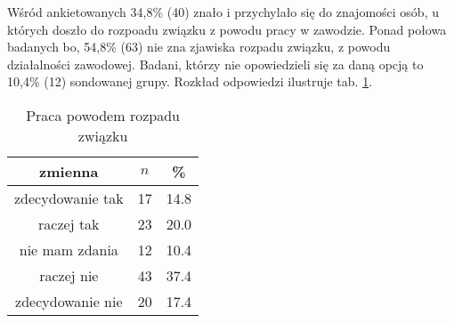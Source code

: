 

Wśród ankietowanych 34,8\% (40) znało i przychylało się do znajomości osób, u których doszło do rozpoadu związku z powodu pracy w zawodzie. Ponad połowa badanych bo, 54,8\% (63) nie zna zjawiska rozpadu związku, z powodu działalności zawodowej. Badani, którzy nie opowiedzieli się za daną opcją to 10,4\% (12) sondowanej grupy. Rozkład odpowiedzi ilustruje tab. \ref{tab:Q29}.

\begin{table}[H]
\caption{Praca powodem rozpadu związku}
\centering
\begin{tabular}{ | c | c | c |}
\hline
zmienna & $n$ & \% \\
\hline
zdecydowanie tak  &  17  & 14.8 \\
\hline
raczej tak  &  23  & 20.0 \\
\hline
nie mam zdania  &  12  & 10.4\\
\hline
raczej nie  &  43  & 37.4\\
\hline
zdecydowanie nie  &  20  & 17.4 \\
\hline
\end{tabular}
\label{tab:Q29}
\end{table}
